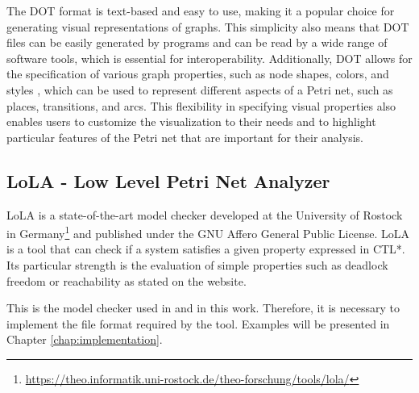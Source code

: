 The DOT format is text-based and easy to use,
making it a popular choice for generating visual representations of graphs.
This simplicity also means that DOT files can be easily generated by programs
and can be read by a wide range of software tools,
which is essential for interoperability.
Additionally, DOT allows for the specification of various graph properties,
such as node shapes, colors, and styles \cite{dot2015},
which can be used to represent different aspects of a Petri net,
such as places, transitions, and arcs.
This flexibility in specifying visual properties also enables users
to customize the visualization to their needs and
to highlight particular features of the Petri net
that are important for their analysis.

\subsection{LoLA - Low Level Petri Net Analyzer}

\acrfull{LoLA} is a state-of-the-art model checker
developed at the University of Rostock in
Germany\footnote{\url{https://theo.informatik.uni-rostock.de/theo-forschung/tools/lola/}}
and published under the GNU Affero General Public License.
\acrshort{LoLA} is a tool that can check
if a system satisfies a given property expressed in \acrfull{CTL*}.
Its particular strength is the evaluation of simple properties
such as deadlock freedom or reachability as stated on the website.

This is the model checker used in \cite{meyer2020} and in this work.
Therefore, it is necessary to implement the file format required by the tool.
Examples will be presented in Chapter \ref{chap:implementation}.